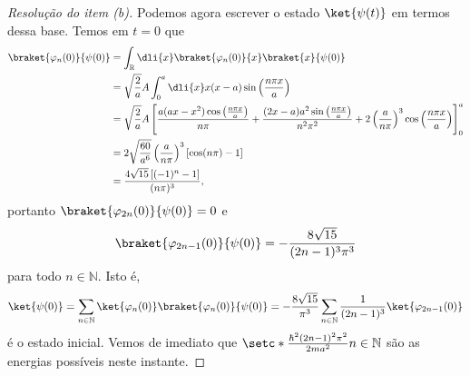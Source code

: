 \begin{proof}[Resolução do item (b)]
    Podemos agora escrever o estado \(\ket{\psi(t)}\) em termos dessa base. Temos em \(t = 0\) que
    \begin{align*}
        \braket{\varphi_n(0)}{\psi(0)}
        &= \int_{\mathbb{R}}\dli{x} \braket{\varphi_n(0)}{x} \braket{x}{\psi(0)}\\
        &= \sqrt{\frac{2}{a}}A\int_0^a \dli{x} x(x-a)\sin\left(\frac{n\pi x}{a}\right)\\
        &= \sqrt{\frac2a}A\left[\frac{a(ax - x^2)\cos\left(\frac{n\pi x}{a}\right)}{n\pi} + \frac{(2x - a)a^2\sin\left(\frac{n\pi x}{a}\right)}{n^2\pi^2} + 2\left(\frac{a}{n\pi}\right)^3 \cos\left(\frac{n\pi x}{a}\right)\right]_0^a\\
        &= 2\sqrt{\frac{60}{a^6}}\left(\frac{a}{n\pi}\right)^3 \left[\cos(n\pi) - 1\right]\\
        &= \frac{4\sqrt{15} \left[(-1)^n - 1\right]}{(n\pi)^3},
    \end{align*}
    portanto \(\braket{\varphi_{2n}(0)}{\psi(0)} = 0\) e
    \begin{equation*}
        \braket{\varphi_{2n-1}(0)}{\psi(0)} =-\frac{8\sqrt{15}}{(2n - 1)^3 \pi^3}
    \end{equation*}
    para todo \(n \in \mathbb{N}\). Isto é,
    \begin{equation*}
        \ket{\psi(0)} = \sum_{n \in \mathbb{N}} \ket{\varphi_n(0)}\braket{\varphi_n(0)}{\psi(0)} = -\frac{8\sqrt{15}}{\pi^3}\sum_{n \in \mathbb{N}} \frac{1}{(2n - 1)^3} \ket{\varphi_{2n-1}(0)}
    \end{equation*}
    é o estado inicial. Vemos de imediato que \(\setc*{\frac{\hbar^2 (2n - 1)^2 \pi^2}{2ma^2}}{n \in \mathbb{N}}\) são as energias possíveis neste instante.
\end{proof}

